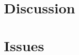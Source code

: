 \documentclass{article}
\begin{document}




\newpage
\section{Discussion}


\section{Issues}

  
\end{document}
